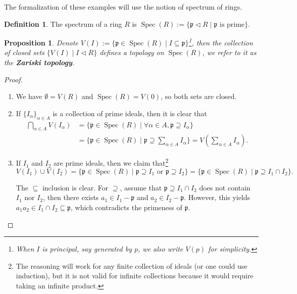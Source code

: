 \documentclass{tufte-handout} %
\newtheorem{prop}[thm]{Proposition}
\theoremstyle{definition}
\newtheorem{defn}[thm]{Definition}
\theoremstyle{remark}
\newcommand{\bra}[1]{\left(#1\right)}
\newcommand{\lp}{{\mathfrak{p}}}
\DeclareMathOperator{\spec}{Spec}
\begin{document}
The formalization of these examples will use the notion of spectrum of rings.
\begin{defn}
	The spectrum of a ring $R$ is $\spec(R) := \{\lp \lhd R\mid \lp \text{ is prime}\}$.
\end{defn}
\begin{prop}
	Denote $V(I) := \{\lp \in \spec(R) \mid I \subseteq \lp\}$\footnote{When $I$ is principal, say generated by $p$, we also write $V(p)$ for simplicity.}, then the collection of closed sets $\{V(I) \mid I \lhd R\}$ defines a topology on $\spec(R)$, we refer to it as the \textbf{Zariski topology}.
\end{prop}
\begin{proof}
	\begin{enumerate}
		\item We have $\emptyset = V(R)$ and $\spec(R) = V(0)$, so both sets are closed.
		\item If $\{I_{\alpha}\}_{\alpha \in A}$ is a collection of prime ideals, then it is clear that \begin{align*}
		\bigcap_{\alpha \in A} V(I_{\alpha}) &= \{\lp \in \spec(R) \mid \forall \alpha \in A, \lp \supseteq I_{\alpha}\}\\
		&= \{\lp \in \spec(R) \mid \lp \supseteq \sum_{\alpha \in A}I_{\alpha}\} = V\bra{\sum_{\alpha \in A} I_{\alpha}}.
		\end{align*}
		
		\item If $I_1$ and $I_2$ are prime ideals, then we claim that\footnote{The reasoning will work for any finite collection of ideals (or one could use induction), but it is not valid for infinite collections because it would require taking an infinite product.} \[V(I_1) \cup V(I_2) = \{\lp \in \spec(R) \mid \lp \supseteq I_1 \text{ or } \lp \supseteq I_2\} = \{\lp \in \spec(R) \mid \lp \supseteq I_1 \cap I_2\}.\]
		
		The $\subseteq$ inclusion is clear. For $\supseteq$, assume that $\lp \supseteq I_1 \cap I_2$ does not contain $I_1$ nor $I_2$, then there exists $a_1 \in I_1 - \lp$ and $a_2 \in I_2 - \lp$. However, this yields $a_1a_2 \in I_1 \cap I_2 \subseteq \lp$, which contradicts the primeness of $\lp$.
	\end{enumerate}
\end{proof}
\end{document}
